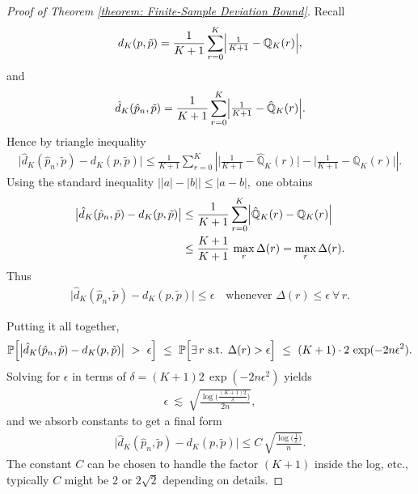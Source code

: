 \documentclass[10pt,a4paper]{amsart}
\begin{document}
\begin{proof}[Proof of Theorem \ref{theorem: Finite-Sample Deviation Bound}]
Recall
\begin{align*}
d_{K}(p,\tilde{p})
=\frac{1}{K+1}
  \sum_{r=0}^K
  \Bigl|
    \tfrac{1}{K+1} - \mathbb{Q}_{K}(r)
  \Bigr|,
\end{align*}
and
\begin{align*}
\hat{d}_{K}(\hat{p}_n,\tilde{p})
=\frac{1}{K+1}
  \sum_{r=0}^K
  \Bigl|
    \tfrac{1}{K+1} - \hat{\mathbb{Q}}_{K}(r)
  \Bigr|.
\end{align*}
Hence by triangle inequality
\begin{align*}
\bigl|
  \hat{d}_{K}(\hat{p}_n,\tilde{p}) 
  -
  d_{K}(p,\tilde{p})
\bigr|\le
\frac{1}{K+1}
\sum_{r=0}^{K}
\left|
  \bigl|
    \tfrac{1}{K+1} - \hat{\mathbb{Q}}_{K}(r)
  \bigr|
  -
  \bigl|
    \tfrac{1}{K+1} - \mathbb{Q}_{K}(r)
  \bigr|
\right|.
\end{align*}
Using the standard inequality
$\bigl||a|-|b|\bigr|\le |a-b|,$ 
one obtains
\begin{align*}
\bigl|
  \hat{d}_{K}(\hat{p}_n,\tilde{p})
  -
  d_{K}(p,\tilde{p})
\bigr|
&\le
\frac{1}{K+1}
\sum_{r=0}^K
\Bigl|
  \hat{\mathbb{Q}}_{K}(r)
  -
  \mathbb{Q}_{K}(r)
\Bigr|
\\&\le
\frac{K+1}{K+1}\,\max_{r}\Delta(r)
=
\max_{r}\Delta(r).
\end{align*}
Thus
\begin{align*}
\bigl|
  \hat{d}_{K}(\hat{p}_n,\tilde{p}) 
  -
  d_{K}(p,\tilde{p})
\bigr|
\le
\epsilon
\quad
\text{whenever }
\Delta(r)\le \epsilon ~\forall\,r.
\end{align*}

Putting it all together,
\begin{align*}
\mathbb{P}\Bigl[
  \bigl|\hat{d}_{K}(\hat{p}_n,\tilde{p}) 
  -
  d_{K}(p,\tilde{p})\bigr|
  ~>~
  \epsilon
\Bigr]
~\le~
\mathbb{P}\Bigl[
  \exists\,r\text{ s.t. } \Delta(r)>\epsilon
\Bigr]
~\le~
(K+1)\cdot 2\,\exp(-2n\epsilon^2).
\end{align*}
Solving for $\epsilon$ in terms of $\delta=(K+1)2\,\exp(-2n\epsilon^2)$ yields 
\begin{align*}
\epsilon
~\lesssim~
\sqrt{\frac{\log\!\bigl(\tfrac{(K+1)2}{\delta}\bigr)}{2n}}
,
\end{align*}
and we absorb constants to get a final form 
\begin{align*}
\bigl|
  \hat{d}_{K}(\hat{p}_n,\tilde{p})
  -
  d_{K}(p,\tilde{p})
\bigr|
\le
C
\,\sqrt{\frac{\log\!\bigl(\tfrac{1}{\delta}\bigr)}{n}}.
\end{align*}
The constant $C$ can be chosen to handle the factor $(K+1)$ inside the log, etc., typically $C$ might be 2 or $2\sqrt{2}$ depending on details.
\end{proof}
\end{document}
